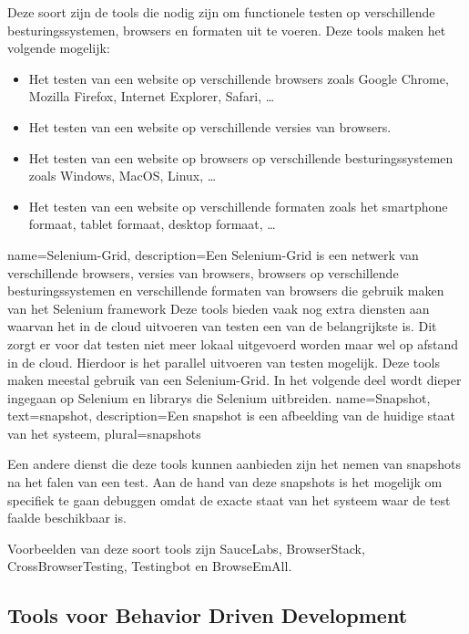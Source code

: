 Deze soort zijn de \glspl{tool} die nodig zijn om functionele testen op verschillende besturingssystemen, browsers en formaten uit te voeren. Deze \glspl{tool} maken het volgende mogelijk: 
\begin{itemize}
\item Het testen van een website op verschillende browsers zoals Google Chrome, Mozilla Firefox, Internet Explorer, Safari, \ldots
\item Het testen van een website op verschillende versies van browsers.
\item Het testen van een website op browsers op verschillende besturingssystemen zoals Windows, MacOS, Linux, \ldots
\item Het testen van een website op verschillende formaten zoals het smartphone formaat, tablet formaat, desktop formaat, \ldots
\end{itemize}
{
    name=Selenium-Grid,
    description={Een Selenium-Grid is een netwerk van verschillende browsers, versies van browsers, browsers op verschillende besturingssystemen en verschillende formaten van browsers die gebruik maken van het Selenium \gls{framework}}
}
Deze \glspl{tool} bieden vaak nog extra diensten aan waarvan het in de cloud uitvoeren van testen een van de belangrijkste is. Dit zorgt er voor dat testen niet meer lokaal uitgevoerd worden maar wel op afstand in de cloud. Hierdoor is het parallel uitvoeren van testen mogelijk. Deze \glspl{tool} maken meestal gebruik van een \gls{Selenium-Grid}. In het volgende deel wordt dieper ingegaan op Selenium en \glspl{library} die Selenium uitbreiden.
{
    name=Snapshot,
    text=snapshot,
    description={Een snapshot is een afbeelding van de huidige staat van het systeem},
    plural={snapshots}
}

Een andere dienst die deze \glspl{tool} kunnen aanbieden zijn het nemen van \glspl{snapshot} na het falen van een test. Aan de hand van deze \glspl{snapshot} is het mogelijk om specifiek te gaan debuggen omdat de exacte staat van het systeem waar de test faalde beschikbaar is.

Voorbeelden van deze soort \glspl{tool} zijn SauceLabs, BrowserStack, CrossBrowserTesting, Testingbot en BrowseEmAll.

\subsection{Tools voor Behavior Driven Development}

